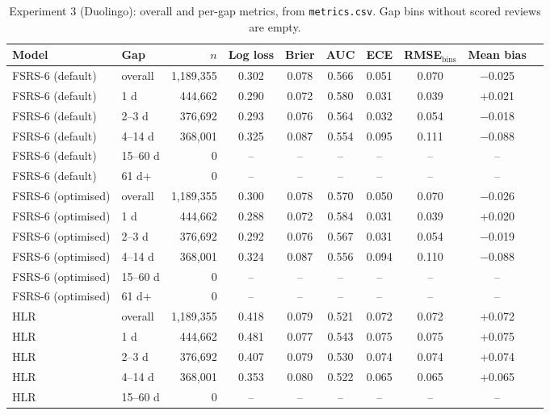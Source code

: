 \begin{table}[htbp]
  \centering
  \footnotesize\setlength{\tabcolsep}{3pt}
  \caption[Experiment 3: per-gap metrics]{Experiment 3 (Duolingo): overall and per-gap metrics, from \texttt{metrics.csv}. Gap bins without scored reviews are empty.}
  \label{tab:appB-duo}
  \begin{tabular}{@{}llrccccccc@{}}
    \toprule
    Model & Gap & $n$ & Log loss & Brier & AUC & ECE & RMSE$_{\mathrm{bins}}$ & Mean bias \\
    \midrule
    FSRS-6 (default) & overall & 1,189,355 & 0.302 & 0.078 & 0.566 & 0.051 & 0.070 & $-$0.025 \\
    FSRS-6 (default) & 1 d & 444,662 & 0.290 & 0.072 & 0.580 & 0.031 & 0.039 & +0.021 \\
    FSRS-6 (default) & 2--3 d & 376,692 & 0.293 & 0.076 & 0.564 & 0.032 & 0.054 & $-$0.018 \\
    FSRS-6 (default) & 4--14 d & 368,001 & 0.325 & 0.087 & 0.554 & 0.095 & 0.111 & $-$0.088 \\
    FSRS-6 (default) & 15--60 d & 0 & -- & -- & -- & -- & -- & -- \\
    FSRS-6 (default) & 61 d+ & 0 & -- & -- & -- & -- & -- & -- \\
    \midrule
    FSRS-6 (optimised) & overall & 1,189,355 & 0.300 & 0.078 & 0.570 & 0.050 & 0.070 & $-$0.026 \\
    FSRS-6 (optimised) & 1 d & 444,662 & 0.288 & 0.072 & 0.584 & 0.031 & 0.039 & +0.020 \\
    FSRS-6 (optimised) & 2--3 d & 376,692 & 0.292 & 0.076 & 0.567 & 0.031 & 0.054 & $-$0.019 \\
    FSRS-6 (optimised) & 4--14 d & 368,001 & 0.324 & 0.087 & 0.556 & 0.094 & 0.110 & $-$0.088 \\
    FSRS-6 (optimised) & 15--60 d & 0 & -- & -- & -- & -- & -- & -- \\
    FSRS-6 (optimised) & 61 d+ & 0 & -- & -- & -- & -- & -- & -- \\
    \midrule
    HLR & overall & 1,189,355 & 0.418 & 0.079 & 0.521 & 0.072 & 0.072 & +0.072 \\
    HLR & 1 d & 444,662 & 0.481 & 0.077 & 0.543 & 0.075 & 0.075 & +0.075 \\
    HLR & 2--3 d & 376,692 & 0.407 & 0.079 & 0.530 & 0.074 & 0.074 & +0.074 \\
    HLR & 4--14 d & 368,001 & 0.353 & 0.080 & 0.522 & 0.065 & 0.065 & +0.065 \\
    HLR & 15--60 d & 0 & -- & -- & -- & -- & -- & -- \\

\end{tabular}
\end{table}
